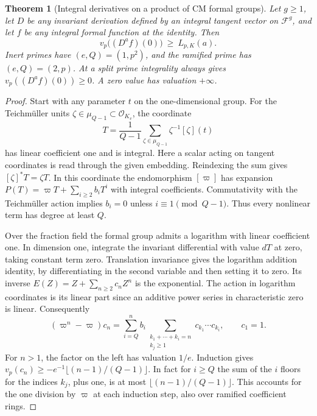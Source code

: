 \documentclass[a4paper,11pt]{article}
\newtheorem{theorem}[proposition]{Theorem}
\theoremstyle{definition}
\theoremstyle{remark}
\numberwithin{equation}{section}
\newcommand{\OO}{\mathcal O}
\begin{document}
\begin{theorem}[Integral derivatives on a product of CM formal groups]\label{thm:cm37}
Let \(g\ge1\), let \(D\) be any invariant derivation defined by an integral tangent vector on \(\mathcal F^g\), and let \(f\) be any integral formal function at the identity. Then
\begin{equation}
              v_p\big((D^a f)(0)\big)\ \ge\ L_{p,K}(a).        \label{eq:jet37}
\end{equation}
Inert primes have \((e,Q)=(1,p^2)\), and the ramified prime has \((e,Q)=(2,p)\). At a split prime integrality always gives \(v_p((D^a f)(0))\ge0\). A zero value has valuation \(+\infty\).
\end{theorem}
\begin{proof}
Start with any parameter \(t\) on the one-dimensional group. For the Teichm\"uller units \(\zeta\in\mu_{Q-1}\subset\OO_{K_v}\), the coordinate
\[
       T=\frac1{Q-1}\sum_{\zeta\in\mu_{Q-1}}\zeta^{-1}[\zeta](t)
\]
has linear coefficient one and is integral. Here a scalar acting on tangent coordinates is read through the given embedding. Reindexing the sum gives \([\zeta]^*T=\zeta T\). In this coordinate the endomorphism \([\varpi]\) has expansion \(P(T)=\varpi T+\sum_{i\ge2} b_iT^i\) with integral coefficients. Commutativity with the Teichm\"uller action implies \(b_i=0\) unless \(i\equiv1\pmod{Q-1}\). Thus every nonlinear term has degree at least \(Q\).

Over the fraction field the formal group admits a logarithm with linear coefficient one. In dimension one, integrate the invariant differential with value \(dT\) at zero, taking constant term zero. Translation invariance gives the logarithm addition identity, by differentiating in the second variable and then setting it to zero. Its inverse \(E(Z)=Z+\sum_{n\ge2}c_nZ^n\) is the exponential. The action in logarithm coordinates is its linear part since an additive power series in characteristic zero is linear. Consequently
\[
  (\varpi^n-\varpi)c_n
   =\sum_{i=Q}^{n} b_i
        \sum_{\substack{k_1+\cdots+k_i=n\\ k_j\ge1}}
                            c_{k_1}\cdots c_{k_i},\qquad c_1=1 .
\]
For \(n>1\), the factor on the left has valuation \(1/e\). Induction gives
\(v_p(c_n)\ge-e^{-1}\lfloor(n-1)/(Q-1)\rfloor\). In fact for \(i\ge Q\) the sum of the \(i\) floors for the indices \(k_j\), plus one, is at most \(\lfloor(n-1)/(Q-1)\rfloor\). This accounts for the one division by \(\varpi\) at each induction step, also over ramified coefficient rings.


\end{proof}
\end{document}
